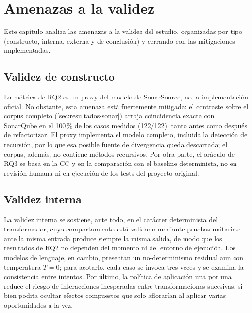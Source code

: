 
\chapter{Amenazas a la validez}
\label{cap:amenazas}

Este capítulo analiza las amenazas a la validez del estudio, organizadas por
tipo (constructo, interna, externa y de conclusión) y cerrando con las
mitigaciones implementadas.

\section{Validez de constructo}
La métrica de RQ2 es un proxy del modelo de SonarSource, no la implementación
oficial. No obstante, esta amenaza está fuertemente mitigada: el contraste
sobre el corpus completo (\autoref{sec:resultados-sonar}) arroja coincidencia
exacta con SonarQube en el 100\,\% de los casos medidos (122/122), tanto antes
como después de refactorizar. El proxy implementa el modelo completo, incluida la detección de recursión, por
lo que esa posible fuente de divergencia queda descartada; el corpus, además, no
contiene métodos recursivos. Por otra parte, el oráculo de RQ3 se
basa en la CC y en la comparación con el baseline determinista, no en revisión
humana ni en ejecución de los tests del proyecto original.

\section{Validez interna}
La validez interna se sostiene, ante todo, en el carácter determinista del
transformador, cuyo comportamiento está validado mediante pruebas unitarias:
ante la misma entrada produce siempre la misma salida, de modo que los
resultados de RQ2 no dependen del momento ni del entorno de ejecución. Los
modelos de lenguaje, en cambio, presentan un no-determinismo residual aun con
temperatura $T=0$; para acotarlo, cada caso se invoca tres veces y se examina la
consistencia entre intentos. Por último, la política de aplicación una por una
reduce el riesgo de interacciones inesperadas entre transformaciones sucesivas,
si bien podría ocultar efectos compuestos que solo aflorarían al aplicar varias
oportunidades a la vez.

